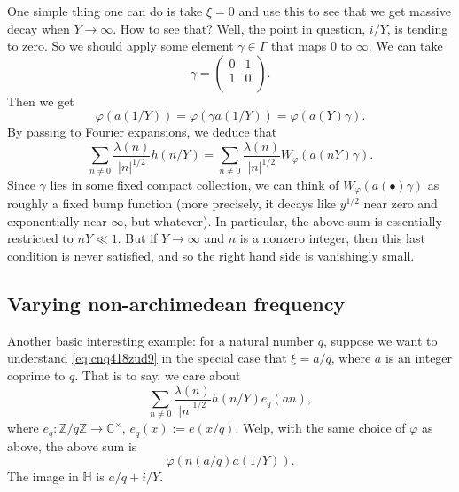 \documentclass[reqno]{amsart} 
\begin{document}
One simple thing one can do is take $\xi = 0$ and use this to see that we get massive decay when $Y \rightarrow \infty$.  How to see that?  Well, the point in question, $i /Y$, is tending to zero.  So we should apply some element $\gamma \in \Gamma$ that maps $0$ to $\infty$.  We can take
\begin{equation*}
  \gamma =
  \begin{pmatrix}
    0    & 1 \\
    1 & 0 \\
  \end{pmatrix}.
\end{equation*}
Then we get
\begin{equation*}
  \varphi(a(1/Y))
  =
  \varphi(\gamma a(1/Y))
  =   \varphi(a(Y) \gamma).
\end{equation*}
By passing to Fourier expansions, we deduce that
\begin{equation*}
  \sum_{n \neq 0}
  \frac{\lambda(n)}{\lvert n \rvert^{1/2}}
  h(n / Y)
  =
  \sum_{n \neq 0}
  \frac{\lambda(n)}{\lvert n \rvert^{1/2}}
  W_\varphi(a(nY) \gamma ).
\end{equation*}
Since $\gamma$ lies in some fixed compact collection, we can think of $W_{\varphi}(a(\bullet) \gamma)$ as roughly a fixed bump function (more precisely, it decays like $y^{1/2}$ near zero and exponentially near $\infty$, but whatever).  In particular, the above sum is essentially restricted to $n Y \ll 1$.  But if $Y \rightarrow \infty$ and $n$ is a nonzero integer, then this last condition is never satisfied, and so the right hand side is vanishingly small.

\subsection{Varying non-archimedean frequency}

Another basic interesting example: for a natural number $q$, suppose we want to understand \eqref{eq:cnq418zud9} in the special case that $\xi = a/q$, where $a$ is an integer coprime to $q$.  That is to say, we care about
\begin{equation*}
  \sum_{n \neq 0}
  \frac{\lambda(n)}{\lvert n \rvert^{1/2}}
  h(n / Y)
  e_q(a n),
\end{equation*}
where $e_q : \mathbb{Z} / q \mathbb{Z} \rightarrow \mathbb{C}^\times$, $e_q(x) := e(x / q)$.  Welp, with the same choice of $\varphi$ as above, the above sum is
\begin{equation*}
  \varphi(n(a/q) a(1/Y)).
\end{equation*}
The image in $\mathbb{H}$ is $a/q + i /Y$.
\end{document}
